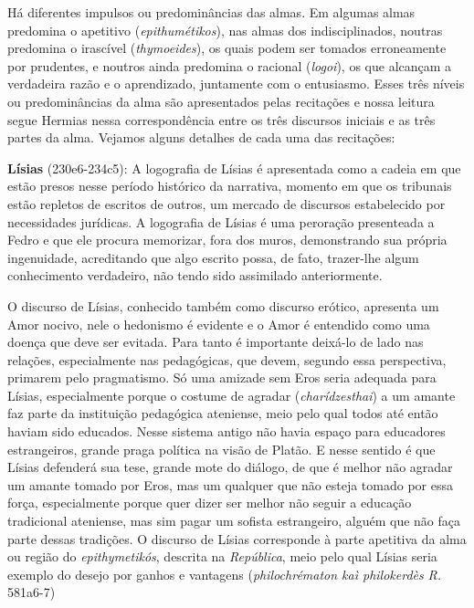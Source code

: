 Há diferentes impulsos ou predominâncias das almas. Em algumas almas
predomina o apetitivo (\emph{epithumétikos}), nas almas dos
indisciplinados, noutras predomina o irascível (\emph{thymoeides}), os
quais podem ser tomados erroneamente por prudentes, e noutros ainda
predomina o racional (\emph{logoi}), os que alcançam a verdadeira razão
e o aprendizado, juntamente com o entusiasmo. Esses três níveis ou
predominâncias da alma são apresentados pelas recitações e nossa leitura
segue Hermias nessa correspondência entre os três discursos iniciais e
as três partes da alma. Vejamos alguns detalhes de cada uma das
recitações:

\textbf{Lísias} (230e6-234c5): A logografia de Lísias é apresentada como
a cadeia em que estão presos nesse período histórico da narrativa,
momento em que os tribunais estão repletos de escritos de outros, um
mercado de discursos estabelecido por necessidades jurídicas. A
logografia de Lísias é uma peroração presenteada a Fedro e que ele
procura memorizar, fora dos muros, demonstrando sua própria ingenuidade,
acreditando que algo escrito possa, de fato, trazer-lhe algum
conhecimento verdadeiro, não tendo sido assimilado anteriormente.

O discurso de Lísias, conhecido também como discurso erótico, apresenta
um Amor nocivo, nele o hedonismo é evidente e o Amor é entendido como
uma doença que deve ser evitada. Para tanto é importante deixá-lo de
lado nas relações, especialmente nas pedagógicas, que devem, segundo
essa perspectiva, primarem pelo pragmatismo. Só uma amizade sem Eros
seria adequada para Lísias, especialmente porque o costume de agradar
(\emph{charídzesthai}) a um amante faz parte da instituição pedagógica
ateniense, meio pelo qual todos até então haviam sido educados. Nesse
sistema antigo não havia espaço para educadores estrangeiros, grande
praga política na visão de Platão. E nesse sentido é que Lísias
defenderá sua tese, grande mote do diálogo, de que é melhor não agradar
um amante tomado por Eros, mas um qualquer que não esteja tomado por
essa força, especialmente porque quer dizer ser melhor não seguir a
educação tradicional ateniense, mas sim pagar um sofista estrangeiro,
alguém que não faça parte dessas tradições. O discurso de Lísias
corresponde à parte apetitiva da alma ou região do \emph{epithymetikós},
descrita na \emph{República}, meio pelo qual Lísias seria exemplo do
desejo por ganhos e vantagens (\emph{philochrématon kaì philokerdès}
\emph{R.} 581a6-7)

